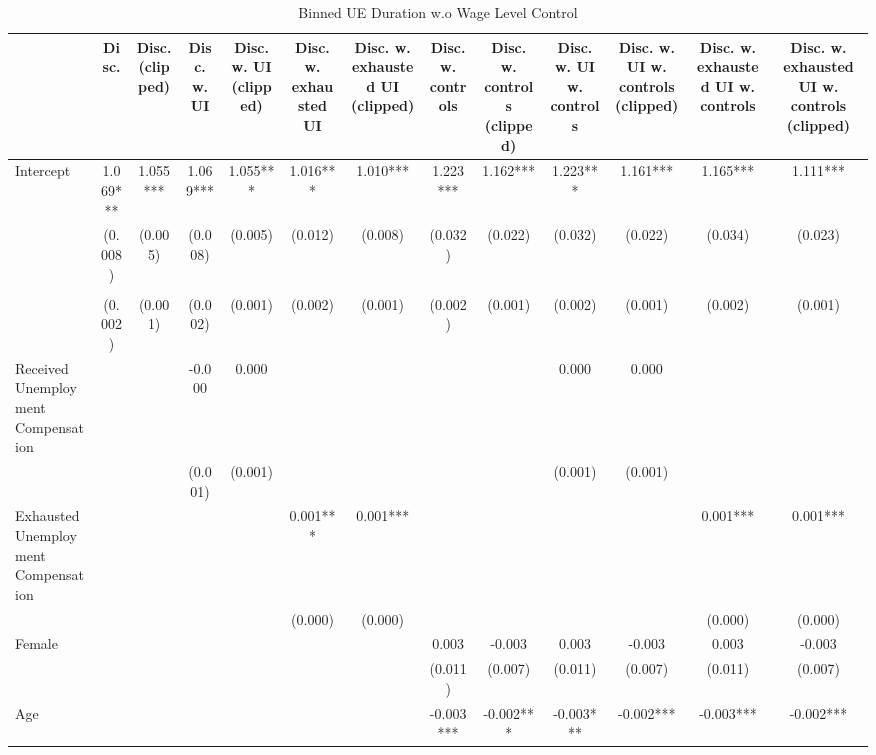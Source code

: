 \documentclass[
]{article}
\begin{document}
\begin{table}[t]
\caption{\label{tab:unnamed-chunk-30}Binned UE Duration w.o Wage Level Control} 
\fontsize{12.0pt}{14.4pt}\selectfont
\begin{tabular*}{\linewidth}{@{\extracolsep{\fill}}lcccccccccccc}
\toprule
  & Disc. & Disc. (clipped) & Disc. w. UI & Disc. w. UI (clipped) & Disc. w. exhausted UI & Disc. w. exhausted UI (clipped) & Disc. w. controls & Disc. w. controls (clipped) & Disc. w. UI w. controls & Disc. w. UI w. controls (clipped) & Disc. w. exhausted UI w. controls & Disc. w. exhausted UI w. controls (clipped) \\ 
\midrule\addlinespace[2.5pt]
Intercept & 1.069*** & 1.055*** & 1.069*** & 1.055*** & 1.016*** & 1.010*** & 1.223*** & 1.162*** & 1.223*** & 1.161*** & 1.165*** & 1.111*** \\ 
 & (0.008) & (0.005) & (0.008) & (0.005) & (0.012) & (0.008) & (0.032) & (0.022) & (0.032) & (0.022) & (0.034) & (0.023) \\ 
{\cellcolor[HTML]{ADD8E6}{Unemployment Duration (Binned)}} & {\cellcolor[HTML]{ADD8E6}{-0.013***}} & {\cellcolor[HTML]{ADD8E6}{-0.009***}} & {\cellcolor[HTML]{ADD8E6}{-0.013***}} & {\cellcolor[HTML]{ADD8E6}{-0.009***}} & {\cellcolor[HTML]{ADD8E6}{-0.008***}} & {\cellcolor[HTML]{ADD8E6}{-0.005***}} & {\cellcolor[HTML]{ADD8E6}{-0.011***}} & {\cellcolor[HTML]{ADD8E6}{-0.008***}} & {\cellcolor[HTML]{ADD8E6}{-0.011***}} & {\cellcolor[HTML]{ADD8E6}{-0.008***}} & {\cellcolor[HTML]{ADD8E6}{-0.007***}} & {\cellcolor[HTML]{ADD8E6}{-0.005***}} \\ 
 & (0.002) & (0.001) & (0.002) & (0.001) & (0.002) & (0.001) & (0.002) & (0.001) & (0.002) & (0.001) & (0.002) & (0.001) \\ 
Received Unemployment Compensation &  &  & -0.000 & 0.000 &  &  &  &  & 0.000 & 0.000 &  &  \\ 
 &  &  & (0.001) & (0.001) &  &  &  &  & (0.001) & (0.001) &  &  \\ 
Exhausted Unemployment Compensation &  &  &  &  & 0.001*** & 0.001*** &  &  &  &  & 0.001*** & 0.001*** \\ 
 &  &  &  &  & (0.000) & (0.000) &  &  &  &  & (0.000) & (0.000) \\ 
Female &  &  &  &  &  &  & 0.003 & -0.003 & 0.003 & -0.003 & 0.003 & -0.003 \\ 
 &  &  &  &  &  &  & (0.011) & (0.007) & (0.011) & (0.007) & (0.011) & (0.007) \\ 
Age &  &  &  &  &  &  & -0.003*** & -0.002*** & -0.003*** & -0.002*** & -0.003*** & -0.002*** \\ 

\end{tabular*}
\end{table}
\end{document}
